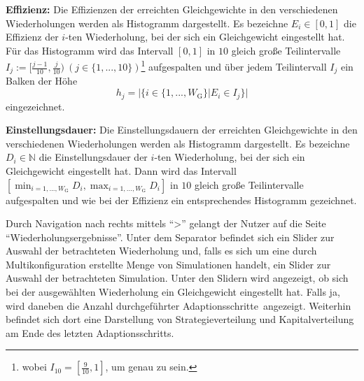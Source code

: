 \documentclass[parskip=full,11pt]{scrartcl}
\def\adapt{Adaptionsschritt}
\def\adapts{Adaptionsschritte}
\begin{document}
\textbf{Effizienz:}
Die Effizienzen der erreichten Gleichgewichte in den verschiedenen Wiederholungen werden als Histogramm dargestellt. Es bezeichne \(E_i \in [0,1]\) die Effizienz der \(i\)-ten Wiederholung, bei der sich ein Gleichgewicht eingestellt hat. Für das Histogramm wird das Intervall \([0,1]\) in \(10\) gleich große Teilintervalle \(I_j := [\frac{j-1}{10},\frac{j}{10}) \ (j \in \{1,...,10\})\)\footnote{wobei \(I_{10} = [\frac{9}{10},1]\), um genau zu sein.} aufgespalten und über jedem Teilintervall \(I_j\) ein Balken der Höhe
\[
h_j = |\{i \in \{1,...,W_\text{G}\} | E_i \in I_j\}|
\]
eingezeichnet.

\textbf{Einstellungsdauer:}
Die Einstellungsdauern der erreichten Gleichgewichte in den verschiedenen Wiederholungen werden als Histogramm dargestellt. Es bezeichne \(D_i \in \mathbb{N}\) die Einstellungsdauer der \(i\)-ten Wiederholung, bei der sich ein Gleichgewicht eingestellt hat. Dann wird das Intervall \([\min_{i = 1,...,W_\text{G}} D_i, \max_{i = 1,...,W_\text{G}} D_i]\) in \(10\) gleich große Teilintervalle aufgespalten und wie bei der Effizienz ein entsprechendes Histogramm gezeichnet.

Durch Navigation nach rechts mittels \enquote{>} gelangt der Nutzer auf die Seite \enquote{Wiederholungsergebnisse}. Unter dem Separator befindet sich ein Slider zur Auswahl der betrachteten Wiederholung und, falls es sich um eine durch Multikonfiguration erstellte Menge von Simulationen handelt, ein Slider zur Auswahl der betrachteten Simulation. Unter den Slidern wird angezeigt, ob sich bei der ausgewählten Wiederholung ein Gleichgewicht eingestellt hat. Falls ja, wird daneben die Anzahl durchgeführter \adapts\ angezeigt. Weiterhin befindet sich dort eine Darstellung von Strategieverteilung und Kapitalverteilung am Ende des letzten \adapt s.
\end{document}
